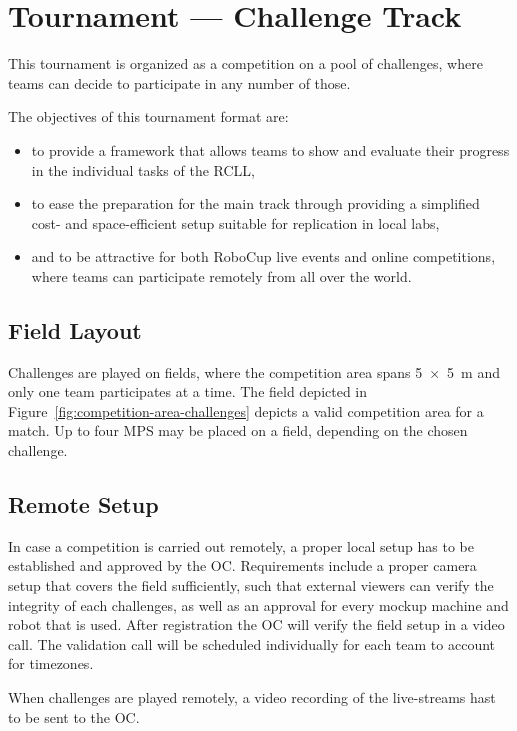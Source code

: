 \documentclass[12pt,twoside]{article}
\newcommand{\reffig}[1]{Figure~\ref{#1}}
\begin{document}

\section{Tournament --- Challenge Track}
\label{sec:tournament-challenges}
This tournament is organized as a competition on a pool of challenges, where
teams can decide to participate in any number of those.

The objectives of this tournament format are:
\begin{itemize}
 \item to provide a framework that allows teams to show and evaluate their
       progress in the individual tasks of the RCLL,
 \item to ease the preparation for the main track through providing a
       simplified cost- and space-efficient setup suitable for replication in
       local labs,
 \item and to be attractive for both RoboCup live events and online
       competitions, where teams can participate remotely from all over the
       world.
\end{itemize}

\subsection{Field Layout}
Challenges are played on fields, where the competition area spans
\SI{5 x 5}{\metre} and only one team participates at a time. %
The field depicted in \reffig{fig:competition-area-challenges} depicts a valid
competition area for a match.
Up to four MPS may be placed on a field, depending on the chosen challenge.

\subsection{Remote Setup}
In case a competition is carried out remotely, a proper local setup has to
be established and approved by the \ac{OC}.
Requirements include a proper camera setup that covers the field sufficiently,
such that external viewers can verify the integrity of each challenges,
as well as an approval for every mockup machine and robot that is used.
After registration the \ac{OC} will verify the field setup in a video call.
The validation call will be scheduled individually for each team
to account for timezones.

When challenges are played remotely, a video recording of the live-streams
hast to be sent to the \ac{OC}.
\end{document}

